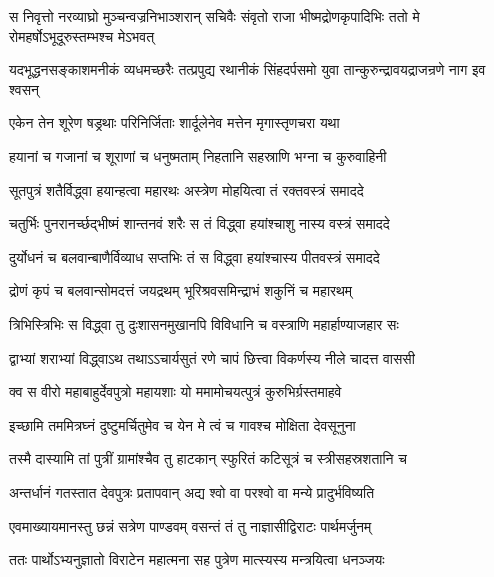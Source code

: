 \threelineshloka
{स निवृत्तो नरव्याघ्रो मुञ्चन्वज्रनिभाञ्शरान्}
{सचिवैः संवृतो राजा भीष्मद्रोणकृपादिभिः}
{ततो मे रोमहर्षोऽभूदूरुस्तम्भश्च मेऽभवत्}


\threelineshloka
{यदभूद्धनसङ्काशमनीकं व्यधमच्छरैः}
{तत्प्रपुद्य रथानीकं सिंहदर्पसमो युवा}
{तान्कुरुन्द्रावयद्राजन्रणे नाग इव श्वसन्}


\twolineshloka
{एकेन तेन शूरेण षड्रथाः परिनिर्जिताः}
{शार्दूलेनेव मत्तेन मृगास्तृणचरा यथा}


\twolineshloka
{हयानां च गजानां च शूराणां च धनुष्मताम्}
{निहतानि सहस्राणि भग्ना च कुरुवाहिनी}


\twolineshloka
{सूतपुत्रं शतैर्विद्ध्वा हयान्हत्वा महारथः}
{अस्त्रेण मोहयित्वा तं रक्तवस्त्रं समाददे}


\twolineshloka
{चतुर्भिः पुनरानर्च्छद्भीष्मं शान्तनवं शरैः}
{स तं विद्ध्वा हयांश्चाशु नास्य वस्त्रं समाददे}


\twolineshloka
{दुर्योधनं च बलवान्बाणैर्विव्याध सप्तभिः}
{तं स विद्ध्वा हयांश्चास्य पीतवस्त्रं समाददे}


\twolineshloka
{द्रोणं कृपं च बलवान्सोमदत्तं जयद्रथम्}
{भूरिश्रवसमिन्द्राभं शकुनिं च महारथम्}


\twolineshloka
{त्रिभिस्त्रिभिः स विद्ध्वा तु दुःशासनमुखानपि}
{विविधानि च वस्त्राणि महार्हाण्याजहार सः}


\twolineshloka
{द्वाभ्यां शराभ्यां विद्ध्वाऽथ तथाऽऽचार्यसुतं रणे}
{चापं छित्त्वा विकर्णस्य नीले चादत्त वाससी}




\twolineshloka
{क्व स वीरो महाबाहुर्देवपुत्रो महायशाः}
{यो ममामोचयत्पुत्रं कुरुभिर्ग्रस्तमाहवे}


\twolineshloka
{इच्छामि तममित्रघ्नं दुष्टुमर्चितुमेव च}
{येन मे त्वं च गावश्च मोक्षिता देवसूनुना}


\twolineshloka
{तस्मै दास्यामि तां पुत्रीं ग्रामांश्चैव तु हाटकान्}
{स्फुरितं कटिसूत्रं च स्त्रीसहस्रशतानि च}




\twolineshloka
{अन्तर्धानं गतस्तात देवपुत्रः प्रतापवान्}
{अद्य श्वो वा परश्वो वा मन्ये प्रादुर्भविष्यति}



\twolineshloka
{एवमाख्यायमानस्तु छन्नं सत्रेण पाण्डवम्}
{वसन्तं तं तु नाज्ञासीद्विराटः पार्थमर्जुनम्}


\twolineshloka
{ततः पार्थोऽभ्यनुज्ञातो विराटेन महात्मना}
{सह पुत्रेण मात्स्यस्य मन्त्रयित्वा धनञ्जयः}


